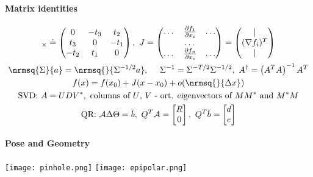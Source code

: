 \documentclass[a4paper,twocolumn]{scrreprt}
\begin{document}
\paragraph*{Matrix identities}
{\tiny
\begin{gather*}
	[t]_\times \doteq \begin{pmatrix}
	0 & -t_3 & t_2 \\
	t_3 & 0 & -t_1 \\
	-t_2 & t_1 & 0
	\end{pmatrix}, ~ J=\begin{pmatrix}
			\dots & \frac{\partial f_1}{\partial x_i} & \dots  \\
				  & \dots & \\
			\dots & \frac{\partial f_n}{\partial x_i} & \dots 
			\end{pmatrix} = 
			\begin{pmatrix}
			\vert \\ (\nabla f_i)^T \\ \vert
			\end{pmatrix} \\
	\nrmsq{\Sigma}{a} = \nrmsq{}{\Sigma^{-1/2}a},~ \quad \Sigma^{-1} = 
	\Sigma^{-T/2}\Sigma^{-1/2}, ~ A^\dagger = \left(A^TA\right)^{-1} A^T\\
		f(x)=f(x_0) + J (x-x_0)+o(\nrmsq{}{\Delta x}) \\
	\text{SVD: } A = U D V^\ast, ~ \text{columns of $U$, $V$ - ort. 
	eigenvectors of $MM^\ast$ and $M^\ast M$} \\
	\text{QR: } \mathcal{A}\Delta\Theta = \breve{b}, ~ Q^T\mathcal{A} = 
	\begin{bmatrix}
	R \\ 0
	\end{bmatrix}, ~Q^T\breve{b} = \begin{bmatrix}
	d \\ e
	\end{bmatrix}
\end{gather*}
}

\paragraph*{Pose and Geometry}

\texttt{[image: pinhole.png]} 
\texttt{[image: epipolar.png]} 
\end{document}
